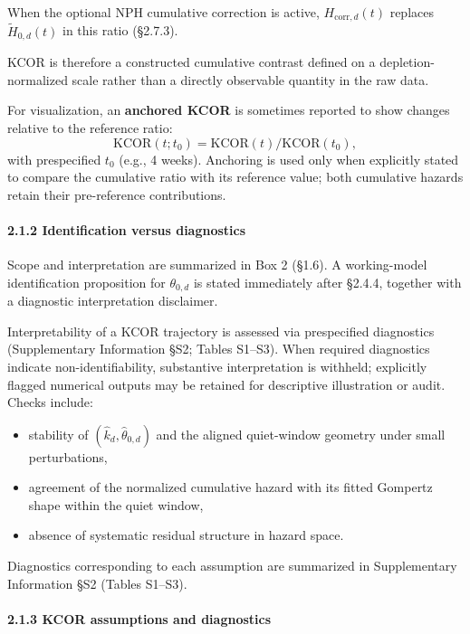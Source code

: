 \documentclass[
]{article}
\providecommand{\tightlist}{%
  \setlength{\itemsep}{0pt}\setlength{\parskip}{0pt}}
\begin{document}
When the optional NPH cumulative correction is active, \(H_{\mathrm{corr},d}(t)\) replaces \(\tilde H_{0,d}(t)\) in this ratio (§2.7.3).

KCOR is therefore a constructed cumulative contrast defined on a depletion-normalized scale rather than a directly observable quantity in the raw data.

For visualization, an \textbf{anchored KCOR} is sometimes reported to show changes relative to the reference ratio: \[\mathrm{KCOR}(t; t_0) = \mathrm{KCOR}(t)/\mathrm{KCOR}(t_0),\] with prespecified \(t_0\) (e.g., 4 weeks). Anchoring is used only when explicitly stated to compare the cumulative ratio with its reference value; both cumulative hazards retain their pre-reference contributions.

\paragraph{2.1.2 Identification versus diagnostics}\label{identification-versus-diagnostics}

Scope and interpretation are summarized in Box 2 (§1.6). A working-model identification proposition for \(\theta_{0,d}\) is stated immediately after §2.4.4, together with a diagnostic interpretation disclaimer.

Interpretability of a KCOR trajectory is assessed via prespecified diagnostics (Supplementary Information §S2; Tables S1--S3). When required diagnostics indicate non-identifiability, substantive interpretation is withheld; explicitly flagged numerical outputs may be retained for descriptive illustration or audit. Checks include:

\begin{itemize}
\tightlist
\item
  stability of \((\hat{k}_d,\hat{\theta}_{0,d})\) and the aligned quiet-window geometry under small perturbations,
\item
  agreement of the normalized cumulative hazard with its fitted Gompertz shape within the quiet window,
\item
  absence of systematic residual structure in hazard space.
\end{itemize}

Diagnostics corresponding to each assumption are summarized in Supplementary Information §S2 (Tables S1--S3).

\paragraph{2.1.3 KCOR assumptions and diagnostics}\label{kcor-assumptions-and-diagnostics}
\end{document}
